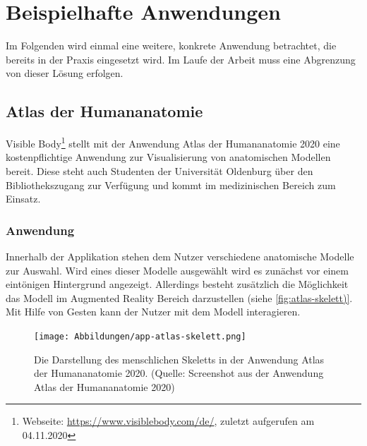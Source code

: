 \section{Beispielhafte Anwendungen}
Im Folgenden wird einmal eine weitere, konkrete Anwendung betrachtet, die bereits in der Praxis eingesetzt wird. Im Laufe der Arbeit muss eine Abgrenzung von dieser Lösung erfolgen.

\subsection{Atlas der Humananatomie}\label{sec:atlas-humananatomie}
Visible Body\footnote{Webseite: \url{https://www.visiblebody.com/de/}, zuletzt aufgerufen am 04.11.2020} stellt mit der Anwendung \glqq Atlas der Humananatomie 2020\grqq{} eine kostenpflichtige Anwendung zur Visualisierung von anatomischen Modellen bereit. Diese steht auch Studenten der Universität Oldenburg über den Bibliothekszugang zur Verfügung und kommt im medizinischen Bereich zum Einsatz. 

\subsubsection{Anwendung}
Innerhalb der Applikation stehen dem Nutzer verschiedene anatomische Modelle zur Auswahl. Wird eines dieser Modelle ausgewählt wird es zunächst vor einem eintönigen Hintergrund angezeigt. Allerdings besteht zusätzlich die Möglichkeit das Modell im Augmented Reality Bereich darzustellen (siehe \ref{fig:atlas-skelett)}. \\
Mit Hilfe von Gesten kann der Nutzer mit dem Modell interagieren.
\begin{figure}[h!]
\centering
\texttt{[image: Abbildungen/app-atlas-skelett.png]}
\caption[Atlas der Humananatomie: Screenshot]{Die Darstellung des menschlichen Skeletts in der Anwendung \glqq Atlas der Humananatomie 2020\grqq . (Quelle: Screenshot aus der Anwendung \glqq Atlas der Humananatomie 2020\grqq )}
\label{fig:atlas-skelett}
\end{figure}
